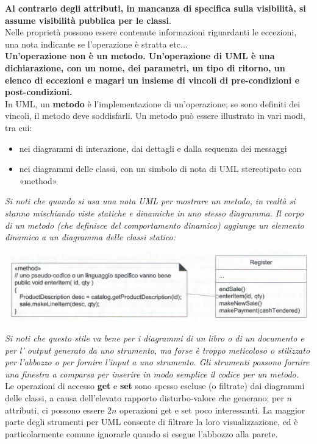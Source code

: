 \documentclass[a4paper,12pt, oneside]{book}
\begin{document}
\textbf{Al contrario degli attributi, in mancanza di specifica sulla visibilità, si assume visibilità pubblica per le classi}.\\
Nelle proprietà possono essere contenute informazioni riguardanti le eccezioni, una nota indicante se l'operazione è stratta etc...\\
\textbf{Un'operazione non è un metodo. Un'operazione di UML è una dichiarazione, con un
nome, dei parametri, un tipo di ritorno, un elenco di eccezioni e magari un insieme di
vincoli di pre-condizioni e post-condizioni.}\\
In UML, un \textbf{metodo} è l'implementazione di un'operazione; se sono definiti dei vincoli,
il metodo deve soddisfarli. Un metodo può essere illustrato in vari modi, tra cui:
\begin{itemize}
	\item nei diagrammi di interazione, dai dettagli e dalla sequenza dei messaggi
	\item nei diagrammi delle classi, con un simbolo di nota di UML stereotipato con «method»
\end{itemize}
\textit{Si noti che quando si usa una nota UML per mostrare un metodo, in realtà si stanno
mischiando viste statiche e dinamiche in uno stesso diagramma. Il corpo di un metodo
(che definisce del comportamento dinamico) aggiunge un elemento dinamico a un diagramma delle classi statico:}
\begin{center}
	\includegraphics[scale=0.7]{img/clasd7.png}
\end{center}
\textit{Si noti che questo stile va bene per i diagrammi di un libro o di un documento e per
l' output generato da uno strumento, ma forse è troppo meticoloso o stilizzato per l'abbozzo o per fornire l'input a uno strumento. Gli strumenti possono fornire una finestra
a comparsa per inserire in modo semplice il codice per un metodo.}\\
Le operazioni di accesso \textbf{get} e \textbf{set} sono spesso escluse (o filtrate) dai diagrammi delle classi, a causa dell'elevato rapporto disturbo-valore che generano; per $n$ attributi, ci possono essere $2n$ operazioni get e set poco interessanti. La maggior parte degli strumenti per UML consente di filtrare la loro visualizzazione, ed è particolarmente comune ignorarle quando si esegue l'abbozzo alla parete.\\
\end{document}
